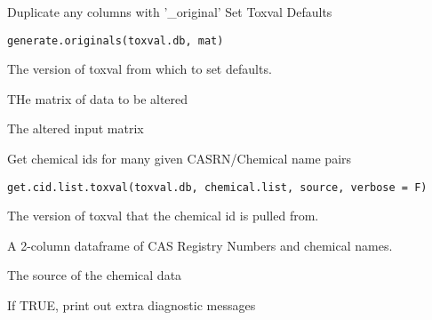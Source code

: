 \documentclass[letterpaper]{book}
\begin{document}
%
\begin{Description}\relax
Duplicate any columns with '\_original'
Set Toxval Defaults
\end{Description}
%
\begin{Usage}
\begin{verbatim}
generate.originals(toxval.db, mat)
\end{verbatim}
\end{Usage}
%
\begin{Arguments}
\begin{ldescription}
\item[\code{toxval.db}] The version of toxval from which to set defaults.

\item[\code{mat}] THe matrix of data to be altered
\end{ldescription}
\end{Arguments}
%
\begin{Value}
The altered input matrix
\end{Value}
%
\begin{Description}\relax
Get chemical ids for many given CASRN/Chemical name pairs
\end{Description}
%
\begin{Usage}
\begin{verbatim}
get.cid.list.toxval(toxval.db, chemical.list, source, verbose = F)
\end{verbatim}
\end{Usage}
%
\begin{Arguments}
\begin{ldescription}
\item[\code{toxval.db}] The version of toxval that the chemical id is pulled from.

\item[\code{chemical.list}] A 2-column dataframe of CAS Registry Numbers and chemical names.

\item[\code{source}] The source of the chemical data

\item[\code{verbose}] If TRUE, print out extra diagnostic messages
\end{ldescription}
\end{Arguments}
\end{document}
